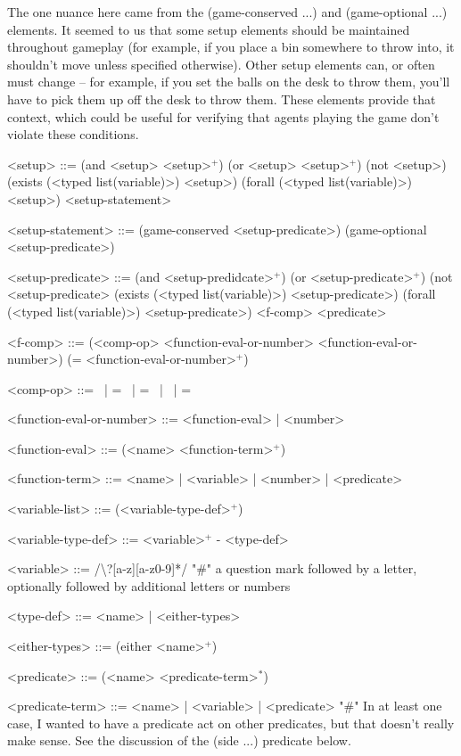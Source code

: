 \documentclass{article}
\begin{document}
        The one nuance here came from the (game-conserved ...) and (game-optional ...) elements. It seemed to us that some setup elements should be maintained
        throughout gameplay (for example, if you place a bin somewhere to throw into, it shouldn't move unless specified otherwise).
        Other setup elements can, or often must change -- for example, if you set the balls on the desk to throw them, you'll have to pick them up off the desk to throw them.
        These elements provide that context, which could be useful for verifying that agents playing the game don't violate these conditions.
        
\begin{grammar}
<setup> ::= (and <setup> <setup>$^+$) \alt
    (or <setup> <setup>$^+$) \alt
    (not <setup>) \alt
    (exists (<typed list(variable)>) <setup>) \alt
    (forall (<typed list(variable)>) <setup>) \alt
    <setup-statement>

<setup-statement> ::= (game-conserved <setup-predicate>) \alt
    (game-optional <setup-predicate>)

<setup-predicate> ::= (and <setup-predidcate>$^+$) \alt
    (or <setup-predicate>$^+$) \alt
    (not <setup-predicate> \alt
    (exists (<typed list(variable)>) <setup-predicate>) \alt
    (forall (<typed list(variable)>) <setup-predicate>) \alt
    <f-comp> \alt
    <predicate>


<f-comp> ::= (<comp-op> <function-eval-or-number> <function-eval-or-number>) \alt
    (= <function-eval-or-number>$^+$)
    
<comp-op> ::=  \textlangle \ | \textlangle = \ | = \ | \textrangle \ | \textrangle =

<function-eval-or-number> ::= <function-eval> | <number>

<function-eval> ::= (<name> <function-term>$^+$)

<function-term> ::= <name> | <variable> | <number> | <predicate>

<variable-list> ::= (<variable-type-def>$^+$)

<variable-type-def> ::= <variable>$^+$ - <type-def>

<variable> ::= /\textbackslash?[a-z][a-z0-9]*/  "#" a question mark followed by a letter, optionally followed by additional letters or numbers

<type-def> ::= <name> | <either-types>

<either-types> ::= (either <name>$^+$)

<predicate> ::= (<name> <predicate-term>$^*$)

<predicate-term> ::= <name> | <variable> | <predicate> "#" In at least one case, I wanted to have a predicate act on other predicates, but that doesn't really make sense. See the discussion of the (side ...) predicate below.


\end{grammar}
\end{document}
